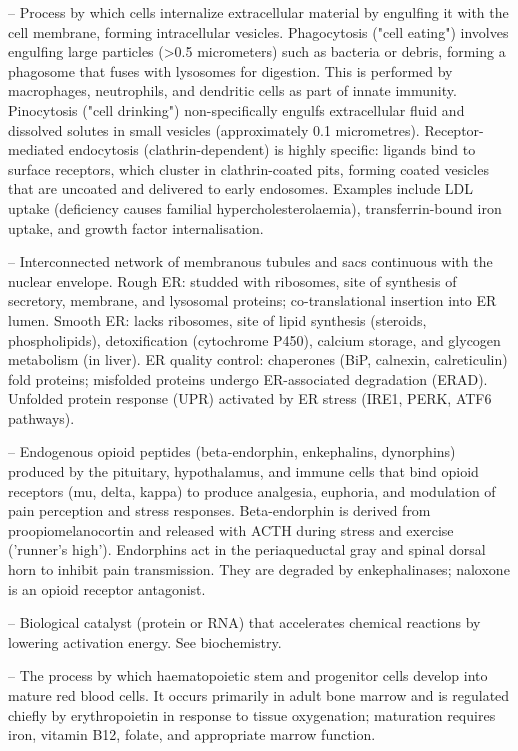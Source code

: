 -- Process by which cells internalize extracellular material by engulfing it with the cell membrane, forming intracellular vesicles. Phagocytosis ("cell eating") involves engulfing large particles (>0.5 micrometers) such as bacteria or debris, forming a phagosome that fuses with lysosomes for digestion. This is performed by macrophages, neutrophils, and dendritic cells as part of innate immunity. Pinocytosis ("cell drinking") non-specifically engulfs extracellular fluid and dissolved solutes in small vesicles (approximately 0.1 micrometres). Receptor-mediated endocytosis (clathrin-dependent) is highly specific: ligands bind to surface receptors, which cluster in clathrin-coated pits, forming coated vesicles that are uncoated and delivered to early endosomes. Examples include LDL uptake (deficiency causes familial hypercholesterolaemia), transferrin-bound iron uptake, and growth factor internalisation.

-- Interconnected network of membranous tubules and sacs continuous with the nuclear envelope. Rough ER: studded with ribosomes, site of synthesis of secretory, membrane, and lysosomal proteins; co-translational insertion into ER lumen. Smooth ER: lacks ribosomes, site of lipid synthesis (steroids, phospholipids), detoxification (cytochrome P450), calcium storage, and glycogen metabolism (in liver). ER quality control: chaperones (BiP, calnexin, calreticulin) fold proteins; misfolded proteins undergo ER-associated degradation (ERAD). Unfolded protein response (UPR) activated by ER stress (IRE1, PERK, ATF6 pathways).

-- Endogenous opioid peptides (beta-endorphin, enkephalins, dynorphins) produced by the pituitary, hypothalamus, and immune cells that bind opioid receptors (mu, delta, kappa) to produce analgesia, euphoria, and modulation of pain perception and stress responses. Beta-endorphin is derived from proopiomelanocortin and released with ACTH during stress and exercise ('runner's high'). Endorphins act in the periaqueductal gray and spinal dorsal horn to inhibit pain transmission. They are degraded by enkephalinases; naloxone is an opioid receptor antagonist.

-- Biological catalyst (protein or RNA) that accelerates chemical reactions by lowering activation energy. See biochemistry.

-- The process by which haematopoietic stem and progenitor cells develop into mature red blood cells. It occurs primarily in adult bone marrow and is regulated chiefly by erythropoietin in response to tissue oxygenation; maturation requires iron, vitamin B12, folate, and appropriate marrow function.

